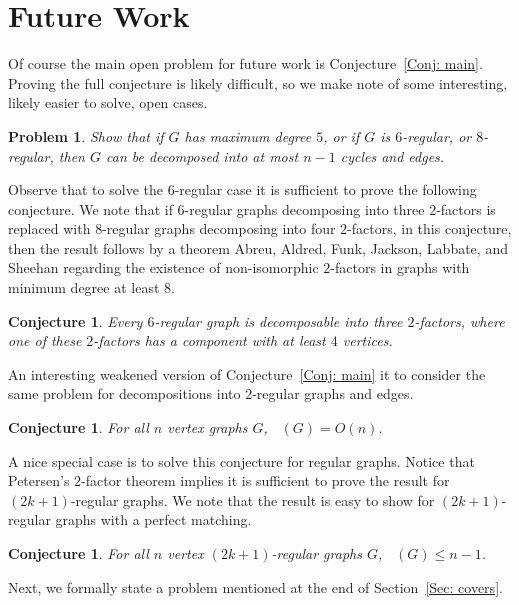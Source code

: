 \documentclass[11pt]{amsart}
\newtheorem{conjecture}[theorem]{Conjecture}
\newtheorem{problem}[theorem]{Problem}
\theoremstyle{definition}
\DeclareMathOperator{\re}{f_{re}}
\begin{document}
\section{Future Work}

Of course the main open problem for future work is Conjecture~\ref{Conj: main}.
Proving the full conjecture is likely difficult, so we make note of some interesting, likely easier to solve, open cases.

\begin{problem}
    Show that if $G$ has maximum degree $5$, or if $G$ is $6$-regular, or $8$-regular,
    then $G$ can be decomposed into at most $n-1$ cycles and edges.
\end{problem}

Observe that to solve the $6$-regular case it is sufficient to prove the following conjecture.
We note that if $6$-regular graphs decomposing into three $2$-factors is replaced with $8$-regular graphs decomposing into four $2$-factors,
in this conjecture, 
then the result follows by a theorem Abreu, Aldred, Funk, Jackson, Labbate, and Sheehan \cite{abreu2004graphs}
regarding the existence of non-isomorphic $2$-factors in graphs with minimum degree at least $8$. 

\begin{conjecture}
    Every $6$-regular graph is decomposable into three $2$-factors, where one of these $2$-factors has a component with at least $4$ vertices.
\end{conjecture}



An interesting weakened version of Conjecture~\ref{Conj: main} it to consider the same problem for decompositions into $2$-regular graphs and edges.

\begin{conjecture}
    For all $n$ vertex graphs $G$, $\re(G) = O(n)$.
\end{conjecture}

A nice special case is to solve this conjecture for regular graphs.
Notice that Petersen's $2$-factor theorem implies it is sufficient to prove the result for $(2k+1)$-regular graphs.
We note that the result is easy to show for $(2k+1)$-regular graphs with a perfect matching.

\begin{conjecture}
    For all $n$ vertex $(2k+1)$-regular graphs $G$, $\re(G) \leq n-1$.
\end{conjecture}


Next, we formally state a problem mentioned at the end of Section~\ref{Sec: covers}.
\end{document}

